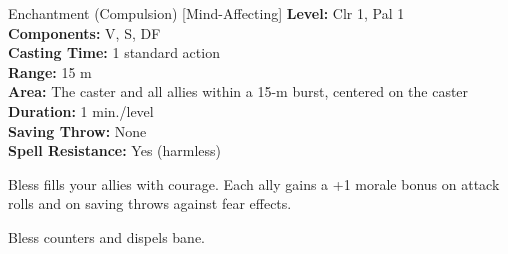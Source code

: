 {Enchantment (Compulsion) [Mind-Affecting]}
{
	\textbf{Level:}
	Clr 1, Pal 1\\
	\textbf{Components:}
	V, S, DF\\
	\textbf{Casting Time:}
	1 standard action\\
	\textbf{Range:}
	15 m\\
	\textbf{Area:}
	The caster and all allies within a 15-m burst, centered on the caster\\
	\textbf{Duration:}
	1 min./level\\
	\textbf{Saving Throw:}
	None\\
	\textbf{Spell Resistance:}
	Yes (harmless)\\
}
{
	Bless fills your allies with courage. Each ally gains a +1 morale bonus on attack rolls and on saving throws against fear effects.

	Bless counters and dispels bane.

}
